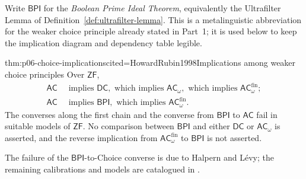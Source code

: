 Write \(\mathsf{BPI}\) for the \emph{Boolean Prime Ideal Theorem}, equivalently
the Ultrafilter Lemma of Definition~\ref{def:ultrafilter-lemma}.  This is a
metalinguistic abbreviation for the weaker choice principle already stated in
Part~1; it is used below to keep the implication diagram and dependency table
legible.

\begin{hbtheorem}{thm:p06-choice-implications}{cited=HowardRubin1998}{Implications among weaker choice principles}
Over \(\mathsf{ZF}\),
\[
  \begin{aligned}
    \mathsf{AC}&\ \text{ implies }\mathsf{DC},\text{ which implies }
      \mathsf{AC}_{\omega},\text{ which implies }
      \mathsf{AC}_{\omega}^{\mathrm{fin}};\\
    \mathsf{AC}&\ \text{ implies }\mathsf{BPI},\text{ which implies }
      \mathsf{AC}_{\omega}^{\mathrm{fin}}.
  \end{aligned}
\]
The converses along the first chain and the converse from \(\mathsf{BPI}\) to
\(\mathsf{AC}\) fail in suitable models of \(\mathsf{ZF}\).  No comparison
between \(\mathsf{BPI}\) and either \(\mathsf{DC}\) or
\(\mathsf{AC}_{\omega}\) is asserted, and the reverse implication from
\(\mathsf{AC}_{\omega}^{\mathrm{fin}}\) to \(\mathsf{BPI}\) is not asserted.
\end{hbtheorem}
The failure of the \(\mathsf{BPI}\)-to-Choice converse is due to Halpern and
L\'evy; the remaining calibrations and models are catalogued in
\cite{Jech1973Choice,HowardRubin1998,HalpernLevy1971}.

